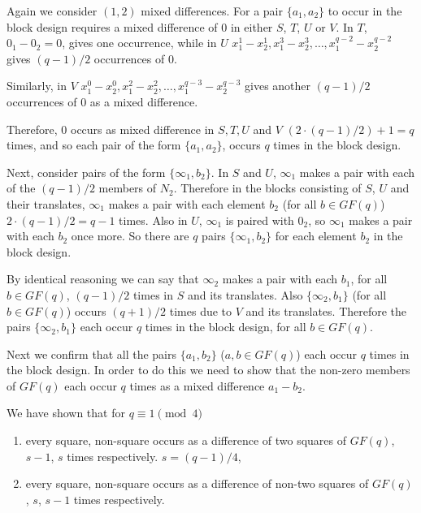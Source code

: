 Again we consider $(1, 2)$ mixed differences.
For a pair $\{a_1, a_2\}$ to occur in the block design requires a mixed difference of 0 in either $S$, $T$, $U$ or $V$.
In $T$, $0_1 - 0_2 = 0$, gives one occurrence, while in $U$ $x_{1}^{1} - x_{2}^{1}, x_{1}^{3} - x_{2}^{3}, \ldots, x_{1}^{q - 2} - x_{2}^{q - 2}$ gives $(q - 1)/2$ occurrences of 0.

Similarly, in $V$ $x_{1}^{0} - x_{2}^{0}, x_{1}^{2} - x_{2}^{2}, \ldots, x_{1}^{q - 3} - x_{2}^{q - 3}$ gives another $(q - 1)/2$ occurrences of 0 as a mixed difference.

Therefore, 0 occurs as mixed difference in $S, T, U$ and $V$ $(2\cdot (q - 1)/2) + 1 = q$ times, and so each pair of the form $\{a_1, a_2\}$, occurs $q$ times in the block design.

Next, consider pairs of the form $\{\infty _1, b_2\}$.
In $S$ and $U$, $\infty _1$ makes a pair with each of the $(q - 1)/2$ members of $N_2$.
Therefore in the blocks consisting of $S$, $U$ and their translates, $\infty _1$ makes a pair with each element $b_2$ (for all $b \in GF(q)$) $2 \cdot (q - 1)/2 = q - 1$ times.
Also in $U$, $\infty _1$ is paired with $0_2$, so $\infty _1$ makes a pair with each $b_2$ once more.
So there are $q$ pairs $\{\infty _1, b_2\}$ for each element $b_2$ in the block design.

By identical reasoning we can say that $\infty _2$ makes a pair with each $b_1$, for all $b \in GF(q)$, $(q - 1)/2$ times in $S$ and its translates.
Also $\{\infty _2, b_1\}$ (for all $b \in GF(q)$) occurs $(q + 1)/2$ times due to $V$ and its translates.
Therefore the pairs $\{\infty _2, b_1 \}$ each occur $q$ times in the block design, for all $b \in GF(q)$.

Next we confirm that all the pairs $\{a_1, b_2\}$ ($a, b \in GF(q)$) each occur $q$ times in the block design.
In order to do this we need to show that the non-zero members of $GF(q)$ each occur $q$ times as a mixed difference $a_1 - b_2$.

We have shown that for $q \equiv 1\pmod 4$
\begin{enumerate}
  \item{every square, non-square occurs as a difference of two
      squares of $GF(q)$, $s - 1$, $s$ times respectively.
      $s = (q - 1)/4$,}
  \item{every square, non-square occurs as a difference of
      non-two squares of $GF(q)$, $s$, $s - 1$ times
      respectively.}
\end{enumerate}

